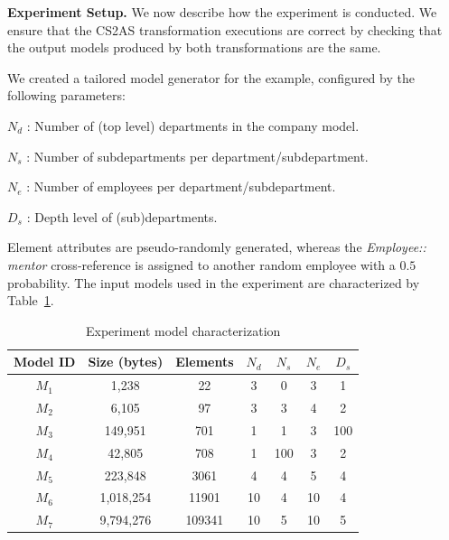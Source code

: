 \documentclass{llncs}
\begin{document}

	
\textbf{Experiment Setup.} We now describe how the experiment is conducted. We ensure that the CS2AS transformation executions are correct by checking that the output models produced by both transformations are the same. 

We created a tailored model generator for the  example, configured by the following parameters:

$N_d$ : Number of (top level) departments in the company model.

$N_s$ : Number of subdepartments per department/subdepartment.

$N_e$ : Number of employees per department/subdepartment.

$D_s$ : Depth level of (sub)departments.


Element attributes are pseudo-randomly generated, whereas the \textit{Employee:: mentor} cross-reference is assigned to another random employee with a $0.5$ probability. The input models used in the experiment are characterized by Table~\ref{tbl:models}.

\begin{table}	
	\centering
	\caption{Experiment model characterization}
	\begin{tabular}{c||c|c|c|c|c|c}
	Model ID & Size (bytes) & Elements &  $N_d$ & $N_s$ & $N_e$ & $D_s$ \\
	\hline		
	$M_1$ & 1,238  & 22 & 3 & 0 & 3 & 1 \\
	$M_2$ & 6,105 & 97 & 3 & 3 & 4 & 2 \\
  	$M_3$ & 149,951 & 701 & 1 & 1 & 3 & 100 \\
	$M_4$ & 42,805 & 708 & 1 & 100 & 3 & 2 \\
	$M_5$ & 223,848 & 3061 & 4 & 4 & 5 & 4 \\
	$M_6$ & 1,018,254 & 11901 & 10 & 4 & 10 & 4 \\
	$M_7$ & 9,794,276 & 109341 & 10 & 5 & 10 & 5 \\
	\hline
	\end{tabular}
	\label{tbl:models}
\end{table}
\end{document}
